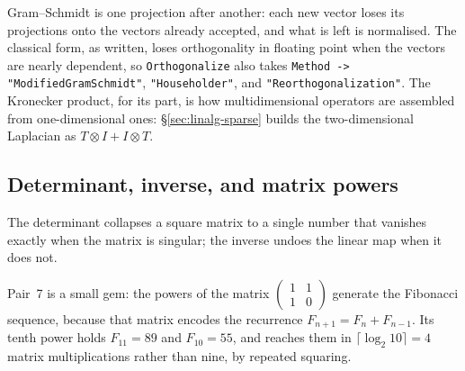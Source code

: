 Gram--Schmidt is one projection after another: each new vector loses its
projections onto the vectors already accepted, and what is left is normalised.
The classical form, as written, loses orthogonality in floating point when the
vectors are nearly dependent, so \texttt{Orthogonalize} also takes
\texttt{Method -> "ModifiedGramSchmidt"}, \texttt{"Householder"}, and
\texttt{"Reorthogonalization"}. The Kronecker product, for its part, is how
multidimensional operators are assembled from one-dimensional ones:
\S\ref{sec:linalg-sparse} builds the two-dimensional Laplacian as
\(T\otimes I + I\otimes T\).

\subsection{Determinant, inverse, and matrix powers}
\label{ssec:la-det}

The determinant collapses a square matrix to a single number that vanishes exactly
when the matrix is singular; the inverse undoes the linear map when it does not.

\begin{codepairs}
\end{codepairs}

Pair~7 is a small gem: the powers of the matrix \(\left(\begin{smallmatrix}1&1\\1&0\end{smallmatrix}\right)\)
generate the Fibonacci sequence, because that matrix encodes the recurrence
\(F_{n+1}=F_n+F_{n-1}\). Its tenth power holds \(F_{11}=89\) and \(F_{10}=55\), and
 reaches them in \(\lceil\log_2 10\rceil=4\) matrix multiplications
rather than nine, by repeated squaring.

